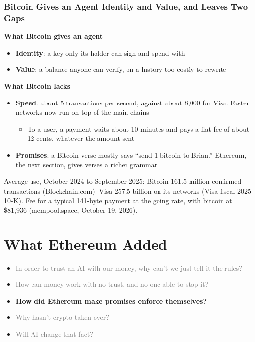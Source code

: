 \documentclass[aspectratio=169]{beamer}
\newcommand{\bi}{\begin{itemize}}
\newcommand{\ei}{\end{itemize}}
\newcommand{\m}{\item}
\begin{document}
\begin{frame}[label=main-btcrecap]
\frametitle{Bitcoin Gives an Agent Identity and Value, and Leaves Two Gaps}

\textbf{\textcolor{gtnavy}{What Bitcoin gives an agent}}
\bi
\m \textbf{Identity}: a key only its holder can sign and spend with
\m \textbf{Value}: a balance anyone can verify, on a history too costly to rewrite
\ei
\vspace{1mm}
\textbf{\textcolor{gtred}{What Bitcoin lacks}}
\bi
\m \textbf{Speed}: about 5 transactions per second, against about 8,000 for Visa. Faster networks now run on top of the main chains
\bi
\m To a user, a payment waits about 10 minutes and pays a flat fee of about 12 cents, whatever the amount sent
\ei
\m \textbf{Promises}: a Bitcoin verse mostly says ``send 1 bitcoin to Brian.'' Ethereum, the next section, gives verses a richer grammar
\ei
\vfill
{\scriptsize Average use, October 2024 to September 2025: Bitcoin 161.5 million confirmed transactions (Blockchain.com); Visa 257.5 billion on its networks (Visa fiscal 2025 10-K). Fee for a typical 141-byte payment at the going rate, with bitcoin at \$81,936 (mempool.space, October 19, 2026).}
\end{frame}


\section{What Ethereum Added}
\begin{frame}
\vfill
\begin{itemize}
\setlength{\itemsep}{3mm}
\item[] \textcolor{gray}{In order to trust an AI with our money, why can't we just tell it the rules?}
\item[] \textcolor{gray}{How can money work with no trust, and no one able to stop it?}
\item[\textcolor{gtnavy}{$\blacktriangleright$}] {\large\textcolor{gtnavy}{\textbf{How did Ethereum make promises enforce themselves?}}}
\item[] \textcolor{gray}{Why hasn't crypto taken over?}
\item[] \textcolor{gray}{\hspace*{8mm}Will AI change that fact?}
\end{itemize}
\vfill
\end{frame}
\end{document}

